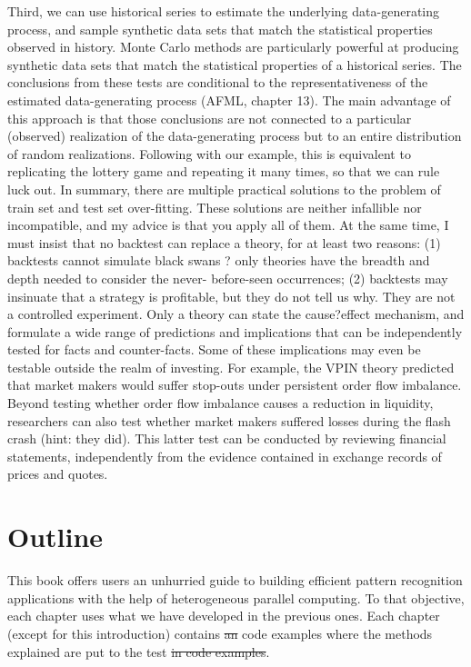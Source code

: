 \documentclass[10pt]{article}[draft]
\begin{document}
\begin{itemize}
		  Third, we can use historical series to estimate the underlying data-generating process, and sample synthetic data sets that match the statistical properties observed in history. Monte Carlo methods are particularly powerful at producing synthetic data sets that match the statistical properties of a historical series. The conclusions from these tests are conditional to the representativeness of the estimated data-generating process (AFML, chapter 13). The main advantage of this approach is that those conclusions are not connected to a particular (observed) realization of the data-generating process but to an entire distribution of random realizations. Following with our example, this is equivalent to replicating the lottery game and repeating it many times, so that we can rule luck out.
		In summary, there are multiple practical solutions to the problem of train set and test set over-fitting. These solutions are neither infallible nor incompatible, and my advice is that you apply all of them. At the same time, I must insist that no backtest can replace a theory, for at least two reasons: (1) backtests cannot simulate black swans ? only theories have the breadth and depth needed to consider the never- before-seen occurrences; (2) backtests may insinuate that a strategy is profitable, but they do not tell us why. They are not a controlled experiment. Only a theory can state the cause?effect mechanism, and formulate a wide range of predictions and implications that can be independently tested for facts and counter-facts. Some of these implications may even be testable outside the realm of investing. For example, the VPIN theory predicted that market makers would suffer stop-outs under persistent order flow imbalance. Beyond testing whether order flow imbalance causes a reduction in liquidity, researchers can also test whether market makers suffered losses during the flash crash (hint: they did). This latter test can be conducted by reviewing financial statements, independently from the evidence contained in exchange records of prices and quotes.
		
		\section*{Outline}
		
		This book offers users an unhurried guide to building efficient pattern recognition applications with the help of heterogeneous parallel computing. To that objective, each chapter uses what we have developed in the previous ones. Each chapter (except for this introduction) contains \st{an} code examples where the methods explained are put to the test\st{ in code examples}.
		

\end{itemize}
\end{document}
